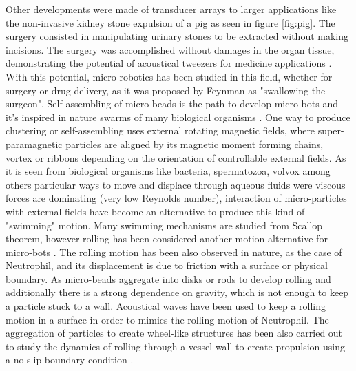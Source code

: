 Other developments were made of transducer arrays to larger applications like the non-invasive kidney stone expulsion of a pig as seen in figure \ref{fig:pig}. The surgery consisted in manipulating urinary stones to be extracted without making incisions. The surgery was accomplished without damages in the organ tissue, demonstrating the potential of acoustical tweezers for medicine applications \cite{Ghanem2020}. With this potential, micro-robotics has been studied in this field, whether for surgery or drug delivery, as it was proposed by Feynman as "swallowing the surgeon". Self-assembling of micro-beads is the path to develop micro-bots and it's inspired in nature swarms of many biological organisms \cite{Medina2017}. One way to produce clustering or self-assembling uses external rotating magnetic fields, where super-paramagnetic particles are aligned by its magnetic moment forming chains, vortex or ribbons depending on the orientation of controllable external fields. As it is seen from biological organisms like bacteria, spermatozoa, volvox among others particular ways to move and displace through aqueous fluids were viscous forces are dominating (very low Reynolds number), interaction of micro-particles with external fields have become an alternative to produce this kind of "swimming" motion. Many swimming mechanisms are studied from Scallop theorem, however rolling has been considered another motion alternative for micro-bots \cite{Purcell1977,Lauga2010}. The rolling motion has been also observed in nature, as the case of Neutrophil, and its displacement is due to friction with a surface or physical boundary. As micro-beads aggregate into disks or rods to develop rolling and additionally there is a strong dependence on gravity, which is not enough to keep a particle stuck to a wall. Acoustical waves have been used to keep a rolling motion in a surface in order to mimics the rolling motion of Neutrophil. The aggregation of particles to create wheel-like structures has been also carried out to study the dynamics of rolling through a vessel wall to create propulsion using a no-slip boundary condition \cite{Kaiser2017, Xie2019, Han2020,Harting2021,Tasci2015}. 

